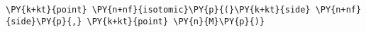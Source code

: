 \begin{Verbatim}[commandchars=\\\{\}]
    \PY{k+kt}{point} \PY{n+nf}{isotomic}\PY{p}{(}\PY{k+kt}{side} \PY{n+nf}{side}\PY{p}{,} \PY{k+kt}{point} \PY{n}{M}\PY{p}{)}
\end{Verbatim}
